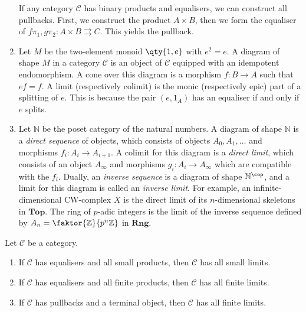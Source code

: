 \begin{example}
\begin{enumerate}
        If any category \( \mathcal C \) has binary products and equalisers, we can construct all pullbacks.
        First, we construct the product \( A \times B \), then we form the equaliser of \( f \pi_1, g \pi_2 : A \times B \rightrightarrows C \).
        This yields the pullback.
        \item Let \( M \) be the two-element monoid \( \qty{1, e} \) with \( e^2 = e \).
        A diagram of shape \( M \) in a category \( \mathcal C \) is an object of \( \mathcal C \) equipped with an idempotent endomorphism.
        A cone over this diagram is a morphism \( f : B \to A \) such that \( ef = f \).
        A limit (respectively colimit) is the monic (respectively epic) part of a splitting of \( e \).
        This is because the pair \( (e, 1_A) \) has an equaliser if and only if \( e \) splits.
        \item Let \( \mathbb N \) be the poset category of the natural numbers.
        A diagram of shape \( \mathbb N \) is a \emph{direct sequence} of objects, which consists of objects \( A_0, A_1, \dots \) and morphisms \( f_i : A_i \to A_{i+1} \).
        A colimit for this diagram is a \emph{direct limit}, which consists of an object \( A_\infty \) and morphisms \( g_i : A_i \to A_\infty \) which are compatible with the \( f_i \).
        Dually, an \emph{inverse sequence} is a diagram of shape \( \mathbb N^\cop \), and a limit for this diagram is called an \emph{inverse limit}.
        For example, an infinite-dimensional CW-complex \( X \) is the direct limit of its \( n \)-dimensional skeletons in \( \mathbf{Top} \).
        The ring of \( p \)-adic integers is the limit of the inverse sequence defined by \( A_n = \faktor{\mathbb Z}{p^n\mathbb Z} \) in \( \mathbf{Rng} \).
    \end{enumerate}
\end{example}
\begin{lemma}
    Let \( \mathcal C \) be a category.
    \begin{enumerate}
        \item If \( \mathcal C \) has equalisers and all small products, then \( \mathcal C \) has all small limits.
        \item If \( \mathcal C \) has equalisers and all finite products, then \( \mathcal C \) has all finite limits.
        \item If \( \mathcal C \) has pullbacks and a terminal object, then \( \mathcal C \) has all finite limits.
    \end{enumerate}
\end{lemma}
